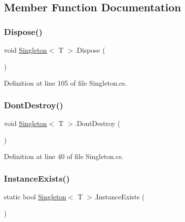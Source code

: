 \subsection{Member Function Documentation}
\mbox{\label{class_singleton_a3af6527458f79b1ade7ab76b30286b6b}} 
\subsubsection{\texorpdfstring{Dispose()}{Dispose()}}
{\footnotesize\ttfamily void \mbox{\hyperlink{class_singleton}{Singleton}}$<$ T $>$.Dispose (\begin{DoxyParamCaption}{ }\end{DoxyParamCaption})}



Definition at line 105 of file Singleton.\+cs.

\mbox{\label{class_singleton_a45ddae0b74be7efd7a92f3c2941fa4c0}} 
\subsubsection{\texorpdfstring{Dont\+Destroy()}{DontDestroy()}}
{\footnotesize\ttfamily void \mbox{\hyperlink{class_singleton}{Singleton}}$<$ T $>$.Dont\+Destroy (\begin{DoxyParamCaption}{ }\end{DoxyParamCaption})\hspace{0.3cm}{\ttfamily [protected]}}



Definition at line 40 of file Singleton.\+cs.

\mbox{\label{class_singleton_ae464548552a00e691241cd16b5b2fc39}} 
\subsubsection{\texorpdfstring{Instance\+Exists()}{InstanceExists()}}
{\footnotesize\ttfamily static bool \mbox{\hyperlink{class_singleton}{Singleton}}$<$ T $>$.Instance\+Exists (\begin{DoxyParamCaption}{ }\end{DoxyParamCaption})\hspace{0.3cm}{\ttfamily [static]}}



